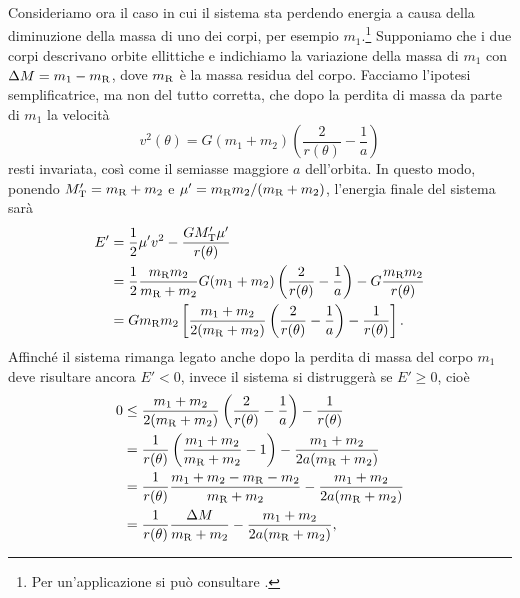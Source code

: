 {Consideriamo ora il caso in cui il sistema sta perdendo energia a causa della
diminuzione della massa di uno dei corpi, per esempio
$m_1$.\footnote{Per un'applicazione si può consultare
  \textcite[350]{padmanabhan:stars}.}
Supponiamo che i due corpi descrivano orbite ellittiche e indichiamo la
variazione della massa di $m_1$ con $\Delta M = m_1 - m_\textup{R}$, dove
$m_\textup{R}$ è la massa residua del corpo. Facciamo l'ipotesi semplificatrice,
ma non del tutto corretta, che dopo la perdita di massa da parte di $m_1$ la
velocità
\begin{equation}
  v^2(\theta) = G(m_1 + m_2)
  \left(
    \frac{2}{r(\theta)} - \frac{1}{a}
  \right)
\end{equation}
resti invariata, così come il semiasse maggiore $a$ dell'orbita. In questo modo,
ponendo $M'_\textup{T}=m_\textup{R}+m_2$ e $\mu' = m_\textup{R}m_2/(m_\textup{R}
+ m_2)$, l'energia finale del sistema sarà
\begin{equation}
  \begin{split}
    E' &= \frac{1}{2}\mu'v^2 - \frac{GM'_\textup{T}\mu'}{r(\theta)} \\
    &= \frac{1}{2}\frac{m_\textup{R}m_2}{m_\textup{R} + m_2}G(m_1 + m_2)
    \left(
      \frac{2}{r(\theta)} - \frac{1}{a}
    \right) - G\frac{m_\textup{R}m_2}{r(\theta)} \\
    &= Gm_\textup{R}m_2
    \left[
      \frac{m_1 + m_2}{2(m_\textup{R} + m_2)}
      \left(
        \frac{2}{r(\theta)} - \frac{1}{a}
      \right) - \frac{1}{r(\theta)}
    \right].
  \end{split}
\end{equation}
Affinché il sistema rimanga legato anche dopo la perdita di massa del corpo
$m_1$ deve risultare ancora $E' < 0$, invece il sistema si distruggerà se $E'
\geq 0$, cioè
\begin{equation}
  \begin{split}
    0 &\leq \frac{m_1 + m_2}{2(m_\textup{R} + m_2)}
    \left(
      \frac{2}{r(\theta)} - \frac{1}{a}
    \right) - \frac{1}{r(\theta)} \\
    &= \frac{1}{r(\theta)}
    \left(
      \frac{m_1 + m_2}{m_\textup{R} + m_2} - 1
    \right) - \frac{m_1 + m_2}{2a(m_\textup{R} + m_2)} \\
    &= \frac{1}{r(\theta)}\frac{m_1 + m_2 - m_\textup{R} - m_2}{m_\textup{R} +
      m_2} - \frac{m_1 + m_2}{2a(m_\textup{R} + m_2)} \\
    &= \frac{1}{r(\theta)}\frac{\Delta M}{m_\textup{R} +
      m_2} - \frac{m_1 + m_2}{2a(m_\textup{R} + m_2)},

\end{split}
\end{equation}}
